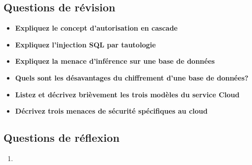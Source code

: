 \documentclass{report}
\begin{document}
		\subsection{Questions de révision}

			\begin{itemize}
				\item \textbf{Expliquez le concept d'autorisation en cascade}
				\item \textbf{Expliquez l'injection SQL par tautologie}
				\item \textbf{Expliquez la menace d'inférence sur une base de données}
				\item \textbf{Quels sont les désavantages du chiffrement d'une base de données?}
				\item \textbf{Listez et décrivez brièvement les trois modèles du service Cloud}
				\item \textbf{Décrivez trois menaces de sécurité spécifiques au cloud}
			\end{itemize}
			

		\subsection{Questions de réflexion}

			\begin{enumerate}
				\item 
			\end{enumerate}
\end{document}
